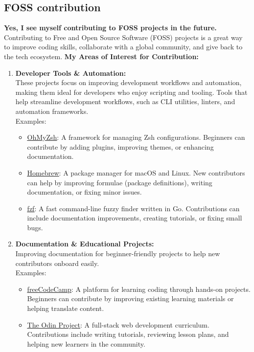 \documentclass[titlepage]{article}
\begin{document}
\subsection{FOSS contribution}
\textbf{Yes, I see myself contributing to FOSS projects in the future.}
\\Contributing to Free and Open Source Software (FOSS) projects is a great way to improve coding skills, collaborate with a global community, and give back to the tech ecosystem.  
\newpage
\textbf{My Areas of Interest for Contribution:}
\begin{enumerate}
\item \textbf{Developer Tools \& Automation:}  
\\These projects focus on improving development workflows and automation, making them ideal for developers who enjoy scripting and tooling. Tools that help streamline development workflows, such as CLI utilities, linters, and automation frameworks.  
\\Examples: 
\begin{itemize}
  \item \href{https://github.com/ohmyzsh/ohmyzsh}{\underline{OhMyZsh}}: A framework for managing Zsh configurations. Beginners can contribute by adding plugins, improving themes, or enhancing documentation.
  \item \href{https://github.com/Homebrew/brew}{\underline{Homebrew}}: A package manager for macOS and Linux. New contributors can help by improving formulae (package definitions), writing documentation, or fixing minor issues.
  \item \href{https://github.com/junegunn/fzf}{\underline{fzf}}: A fast command-line fuzzy finder written in Go. Contributions can include documentation improvements, creating tutorials, or fixing small bugs.
\end{itemize}
\item \textbf{Documentation \& Educational Projects:}
\\Improving documentation for beginner-friendly projects to help new contributors onboard easily.  
\\Examples:
\begin{itemize}
  \item \href{https://github.com/freeCodeCamp/freeCodeCamp}{\underline{freeCodeCamp}}: A platform for learning coding through hands-on projects. Beginners can contribute by improving existing learning materials or helping translate content.
  \item \href{https://github.com/TheOdinProject}{\underline{The Odin Project}}: A full-stack web development curriculum. Contributions include writing tutorials, reviewing lesson plans, and helping new learners in the community.

\end{itemize}
\end{enumerate}
\end{document}
